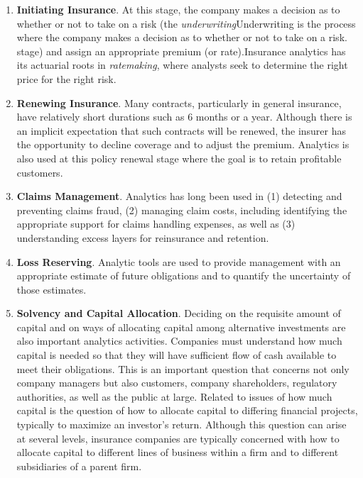 \documentclass[]{book}
\theoremstyle{definition}
\theoremstyle{definition}
\theoremstyle{definition}
\theoremstyle{remark}
\begin{document}
\begin{enumerate}
\def\labelenumi{\arabic{enumi}.}
\item
  \textbf{Initiating Insurance}. At this stage, the company makes a
  decision as to whether or not to take on a risk (the
  \emph{underwriting}{Underwriting is the process where the company
  makes a decision as to whether or not to take on a risk.} stage) and
  assign an appropriate premium (or rate).Insurance analytics has its
  actuarial roots in \emph{ratemaking}, where analysts seek to determine
  the right price for the right risk.
\item
  \textbf{Renewing Insurance}. Many contracts, particularly in general
  insurance, have relatively short durations such as 6 months or a year.
  Although there is an implicit expectation that such contracts will be
  renewed, the insurer has the opportunity to decline coverage and to
  adjust the premium. Analytics is also used at this policy renewal
  stage where the goal is to retain profitable customers.
\item
  \textbf{Claims Management}. Analytics has long been used in (1)
  detecting and preventing claims fraud, (2) managing claim costs,
  including identifying the appropriate support for claims handling
  expenses, as well as (3) understanding excess layers for reinsurance
  and retention.
\item
  \textbf{Loss Reserving}. Analytic tools are used to provide management
  with an appropriate estimate of future obligations and to quantify the
  uncertainty of those estimates.
\item
  \textbf{Solvency and Capital Allocation}. Deciding on the requisite
  amount of capital and on ways of allocating capital among alternative
  investments are also important analytics activities. Companies must
  understand how much capital is needed so that they will have
  sufficient flow of cash available to meet their obligations. This is
  an important question that concerns not only company managers but also
  customers, company shareholders, regulatory authorities, as well as
  the public at large. Related to issues of how much capital is the
  question of how to allocate capital to differing financial projects,
  typically to maximize an investor's return. Although this question can
  arise at several levels, insurance companies are typically concerned
  with how to allocate capital to different lines of business within a
  firm and to different subsidiaries of a parent firm.
\end{enumerate}
\end{document}
